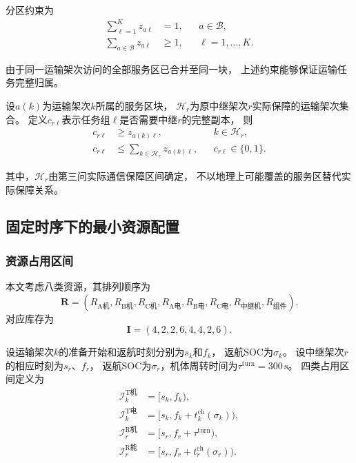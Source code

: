 \documentclass[bwprint]{gmcmthesis}
\begin{document}
分区约束为
\begin{align}
\sum_{\ell=1}^{K}z_{a\ell}&=1,
&& a\in\mathcal{B},\\
\sum_{a\in\mathcal{B}}z_{a\ell}&\geq 1,
&& \ell=1,\ldots,K.
\end{align}

由于同一运输架次访问的全部服务区已合并至同一块，
上述约束能够保证运输任务完整归属。

设$a(k)$为运输架次$k$所属的服务区块，
$\mathcal{H}_r$为原中继架次$r$实际保障的运输架次集合。
定义$c_{r\ell}$表示任务组$\ell$是否需要中继$r$的完整副本，
则
\begin{align}
c_{r\ell}&\geq z_{a(k)\ell},
&& k\in\mathcal{H}_r,\\
c_{r\ell}&\leq
\sum_{k\in\mathcal{H}_r}z_{a(k)\ell},
&& c_{r\ell}\in\{0,1\}.
\end{align}

其中，$\mathcal{H}_r$由第三问实际通信保障区间确定，
不以地理上可能覆盖的服务区替代实际保障关系。

\subsection{固定时序下的最小资源配置}

\subsubsection{资源占用区间}

本文考虑八类资源，其排列顺序为
\begin{equation}
\boldsymbol{R}=
\left(
R_{\mathrm{A机}},R_{\mathrm{B机}},R_{\mathrm{C机}},
R_{\mathrm{A电}},R_{\mathrm{B电}},R_{\mathrm{C电}},
R_{\mathrm{中继机}},R_{\mathrm{组件}}
\right).
\end{equation}
对应库存为
\begin{equation}
\boldsymbol{I}=(4,2,2,6,4,4,2,6).
\end{equation}

设运输架次$k$的准备开始和返航时刻分别为$s_k$和$f_k$，
返航SOC为$\sigma_k$。
设中继架次$r$的相应时刻为$s_r$、$f_r$，
返航SOC为$\sigma_r$，机体周转时间为$\tau^{\mathrm{turn}}=300\,\mathrm{s}$。
四类占用区间定义为
\begin{align}
\mathcal{I}^{\mathrm{T机}}_k
&=[s_k,f_k),\\
\mathcal{I}^{\mathrm{T电}}_k
&=[s_k,f_k+t^{\mathrm{ch}}_k(\sigma_k)),\\
\mathcal{I}^{\mathrm{R机}}_r
&=[s_r,f_r+\tau^{\mathrm{turn}}),\\
\mathcal{I}^{\mathrm{R能}}_r
&=[s_r,f_r+t^{\mathrm{ch}}_r(\sigma_r)).
\end{align}
\end{document}
